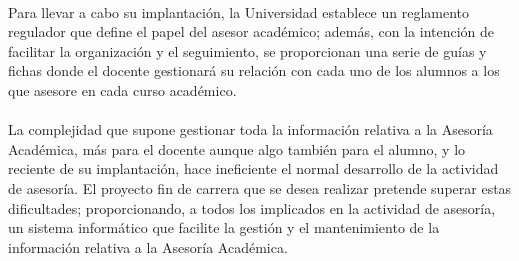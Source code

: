 \paragraph{}Para llevar a cabo su implantación, la Universidad establece un
reglamento regulador que define el papel del asesor académico; además, con la
intención de facilitar la organización y el seguimiento, se proporcionan una
serie de guías y fichas donde el docente gestionará su relación con cada uno de
los alumnos a los que asesore en cada curso académico.

\paragraph{}La complejidad que supone gestionar toda la información
relativa a la Asesoría Académica, más para el docente aunque algo también para
el alumno, y lo reciente de su implantación, hace ineficiente el normal
desarrollo de la actividad de asesoría. El proyecto fin de carrera que se desea
realizar pretende superar estas dificultades; proporcionando, a todos los
implicados en la actividad de asesoría, un sistema informático que facilite la
gestión y el mantenimiento de la información relativa a la Asesoría Académica.
